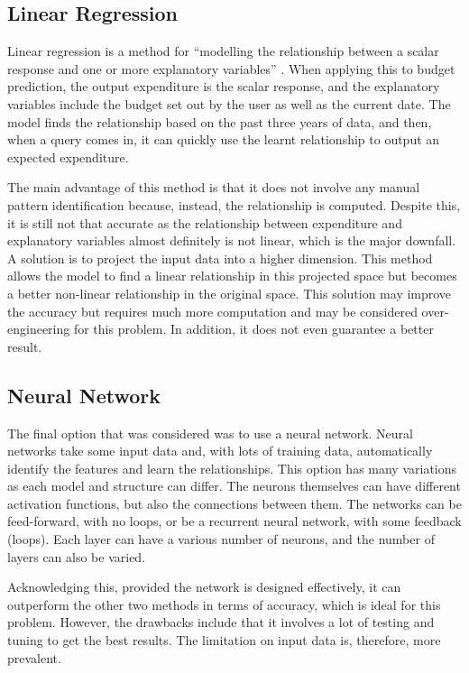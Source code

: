 \subsection{Linear Regression}
Linear regression is a method for ``modelling the relationship between a scalar response and one or more explanatory variables'' \cite{LinearRegressionWiki}. When applying this to budget prediction, the output expenditure is the scalar response, and the explanatory variables include the budget set out by the user as well as the current date. The model finds the relationship based on the past three years of data, and then, when a query comes in, it can quickly use the learnt relationship to output an expected expenditure.

The main advantage of this method is that it does not involve any manual pattern identification because, instead, the relationship is computed. Despite this, it is still not that accurate as the relationship between expenditure and explanatory variables almost definitely is not linear, which is the major downfall. A solution is to project the input data into a higher dimension. This method allows the model to find a linear relationship in this projected space but becomes a better non-linear relationship in the original space. This solution may improve the accuracy but requires much more computation and may be considered over-engineering for this problem. In addition, it does not even guarantee a better result.

\subsection{Neural Network}
The final option that was considered was to use a neural network. Neural networks take some input data and, with lots of training data, automatically identify the features and learn the relationships. This option has many variations as each model and structure can differ. The neurons themselves can have different activation functions, but also the connections between them. The networks can be feed-forward, with no loops, or be a recurrent neural network, with some feedback (loops). Each layer can have a various number of neurons, and the number of layers can also be varied.

Acknowledging this, provided the network is designed effectively, it can outperform the other two methods in terms of accuracy, which is ideal for this problem. However, the drawbacks include that it involves a lot of testing and tuning to get the best results. The limitation on input data is, therefore, more prevalent.

